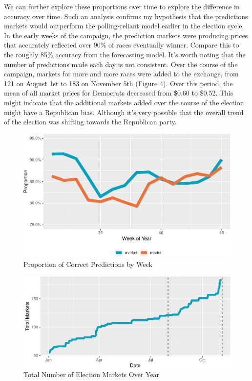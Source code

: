 \documentclass[11pt,]{article}
\begin{document}
We can further explore these proportions over time to explore the
difference in accuracy over time. Such an analysis confirms my
hypothesis that the predictions markets would outperform the
polling-reliant model earlier in the election cycle. In the early weeks
of the campaign, the prediction markets were producing prices that
accurately reflected over 90\% of races eventually winner. Compare this
to the roughly 85\% accuracy from the forecasting model. It's worth
noting that the number of predictions made each day is not consistent.
Over the course of the campaign, markets for more and more races were
added to the exchange, from 121 on August 1st to 183 on November 5th
(Figure 4). Over this period, the mean of all market prices for
Democrats decreased from \$0.60 to \$0.52. This might indicate that the
additional markets added over the course of the election might have a
Republican bias. Although it's very possible that the overall trend of
the election was shifting towards the Republican party.

\begin{figure}
\centering
\includegraphics{paper_files/figure-latex/plot_prop_week-1.pdf}
\caption{Proportion of Correct Predictions by Week}
\end{figure}

\begin{figure}
\centering
\includegraphics{paper_files/figure-latex/plot_cum_markets-1.pdf}
\caption{Total Number of Election Markets Over Year}
\end{figure}
\end{document}
